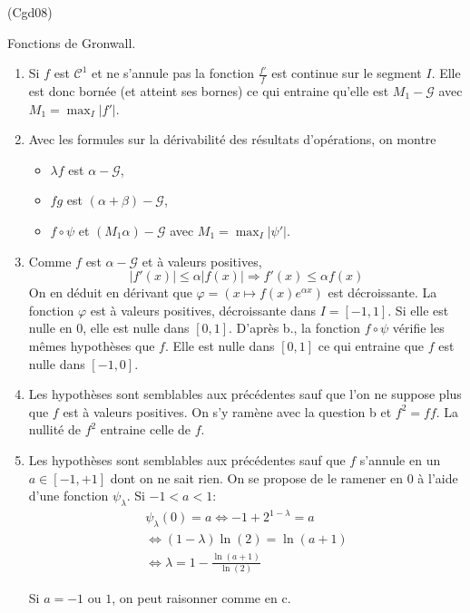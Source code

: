 \begin{tiny}(Cgd08)\end{tiny} Fonctions de Gronwall.
\begin{enumerate}
  \item Si $f$ est $\mathcal{C}^1$ et ne s'annule pas la fonction $\frac{f'}{f}$ est continue sur le segment $I$. Elle est donc bornée (et atteint ses bornes) ce qui entraine qu'elle est $M_1-\mathcal{G}$ avec $M_1 = \max_{I}|f'|$.
  \item Avec les formules sur la dérivabilité des résultats d'opérations, on montre
\begin{itemize}
 \item $\lambda f$ est $\alpha-\mathcal{G}$,
 \item $fg$ est $(\alpha + \beta)-\mathcal{G}$,
 \item $f\circ \psi$ et $(M_1\alpha)-\mathcal{G}$ avec $M_1 = \max_{I}|\psi'|$.
\end{itemize}

  \item Comme $f$ est $\alpha - \mathcal{G}$ et à valeurs positives,
\[
 |f'(x)|\leq \alpha |f(x)| \Rightarrow f'(x)\leq \alpha f(x)
\]
On en déduit en dérivant que $\varphi = \left( x\mapsto f(x)e^{\alpha x}\right) $ est décroissante. La fonction $\varphi$ est à valeurs positives, décroissante dans $I = \left[ -1,1\right] $. Si elle est nulle en $0$, elle est nulle dans $[0,1]$.\newline
D'après b., la fonction $f\circ \psi$ vérifie les mêmes hypothèses que $f$. Elle est nulle dans $[0,1]$ ce qui entraine que $f$ est nulle dans $[-1,0]$.
  \item Les hypothèses sont semblables aux précédentes sauf que l'on ne suppose plus que $f$ est à valeurs positives. On s'y ramène avec la question b et $f^2 = f f$. La nullité de $f^2$ entraine celle de $f$.
  
  \item Les hypothèses sont semblables aux précédentes sauf que $f$ s'annule en un $a\in \left[ -1, +1 \right]$ dont on ne sait rien. On se propose de le ramener en $0$ à l'aide d'une fonction $\psi_\lambda$. \newline
Si $-1 < a < 1$:
\begin{multline*}
\psi_\lambda(0) = a 
\Leftrightarrow 
-1 + 2^{1-\lambda} = a \\
\Leftrightarrow
(1-\lambda)\ln(2) = \ln(a+1)\\
\Leftrightarrow
\lambda = 1 - \frac{\ln(a+1)}{\ln(2)}
\end{multline*}

Si $a=-1$ ou $1$, on peut raisonner comme en c.
\end{enumerate}
